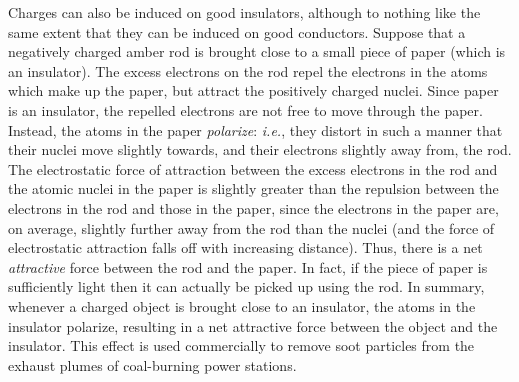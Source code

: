 Charges can also be induced on good insulators, although to nothing like the
same extent that they can be induced on good conductors. Suppose that a negatively
charged amber rod is brought close to a small piece of paper (which is an insulator).
The excess electrons on the rod repel the electrons in the atoms which
make up the paper, but attract the positively charged nuclei. Since paper is an
insulator, the repelled electrons are not free to move through the paper. 
Instead, the atoms in 
the paper {\em polarize}: {\em i.e.}, they distort in such a manner
 that their nuclei move slightly towards, and their electrons slightly
away from, the rod. The electrostatic force of attraction between the excess electrons in the rod
and the atomic nuclei in the paper is slightly greater than the repulsion
between the electrons in the rod and those in the paper, since the electrons in the
paper are, on average, slightly further away from the rod than the nuclei (and
the force of electrostatic attraction falls off with increasing distance). Thus,
there is a net {\em attractive}\/ force between the rod and the paper. In fact, if the
piece of paper is sufficiently light then it can actually be picked up using  the
 rod. In summary, whenever a charged object is brought close to an
insulator, the atoms in the insulator polarize, resulting in
a net attractive force between the object and the insulator. This effect is
used commercially to  remove soot particles from the exhaust plumes of 
coal-burning power stations. 

